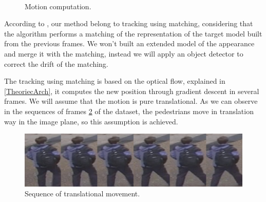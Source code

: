 \documentclass[12pt, a4paper, titlepage,twoside,openright]{article}
\begin{document}
\begin{figure}[H]
		
\centering

\\


\caption{Motion computation.}
\label{tracker1}
\end{figure}



According to \cite{visualTrackingSurvey}, our method belong to tracking using matching, considering that the algorithm performs a matching of the representation of the target model built from the previous frames. We won't built an extended model of the appearance and merge it with the matching, instead we will apply an object detector to correct the drift of the matching.


The tracking using matching is based on the optical flow, explained in \ref{TheoriecArch}, it computes the new position through gradient descent in several frames. We will assume that the motion is pure translational. As we can observe in the sequences of frames \ref{track1w} of the dataset, the pedestrians move in translation way in the image plane, so this assumption is achieved. 


\begin{figure}[H]
\centering         
\includegraphics[width=0.9\linewidth]{changeCamera/tomeu.png}
\caption{Sequence of translational movement.} \label{track1w}
\end{figure}
\end{document}
